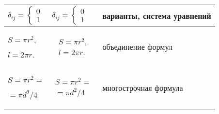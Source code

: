 \documentclass[a4paper, 14pt, reqno, oneside]{extbook}
\begin{document}
\begin{longtable}{|C{0.32\textwidth}|C{0.32\textwidth}|C{0.32\textwidth}|}
$\delta_{ij} = \begin{cases} 0\\ 1 \end{cases}$ & \texttt{$\delta_{ij} = \begin{cases} 0\\ 1 \end{cases}$} & варианты, система уравнений\\\hline
$S = \pi r^2,$\par $l = 2\pi r.$ & \texttt{\begin{gather*} S = \pi r^2,\\ l = 2\pi r. \end{gather*}} & объединение формул\\\hline
$S = \pi r^2 =$\hspace{20mm}\;\par \hspace{20mm}$= \pi d^2/4$ & \texttt{\begin{multline*} S = \pi r^2 =\\ = \pi d^2/4 \end{multline*}} & многострочная формула\\\hline
\end{longtable}
\end{document}
